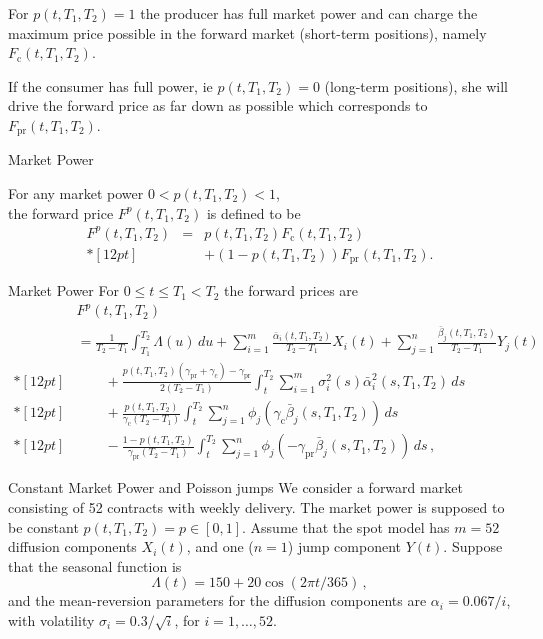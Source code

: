 	For $p(t,T_1,T_2)=1$ the
producer has full market power and can charge the maximum price possible in the forward market (short-term positions),
namely $F_{\text{c}}(t,T_1,T_2)$.


	If the
consumer has full power, ie $p(t,T_1,T_2)=0$ (long-term positions), she will drive the
forward price as far down as possible which corresponds to
$F_{\text{pr}}(t,T_1,T_2)$.






{Market Power}

For any market power $0<p(t,T_1,T_2)<1$,\\
the forward price $F^p(t,T_1,T_2)$ is defined to be
\begin{eqnarray}
\nonumber
F^p(t,T_1,T_2)&=&p(t,T_1,T_2)F_{\text{c}}(t,T_1,T_2)\\*[12pt]
&&+(1-p(t,T_1,T_2))
F_{\text{pr}}(t,T_1,T_2).
\end{eqnarray}

{Market Power}
For $0\leq t\leq T_1<T_2$ the forward prices are
$$\begin{array}{ll}
& F^p(t,T_1,T_2)\\
&=\frac1{T_2-T_1}\int_{T_1}^{T_2}\Lambda(u)\,du
+\sum_{i=1}^m\frac{\bar{\alpha}_i(t,T_1,T_2)}{T_2-T_1}X_i(t)+
\sum_{j=1}^n\frac{\bar{\beta}_j(t,T_1,T_2)}{T_2-T_1}Y_j(t) \\*[12pt]
&\qquad+\frac{p(t,T_1,T_2)(\gamma_{\text{pr}}+
\gamma_{\text{c}})-\gamma_{\text{pr}}}{2(T_2-T_1)}\int_t^{T_2}
\sum_{i=1}^m\sigma_i^2(s)\bar{\alpha}_i^2(s,T_1,T_2)\,ds \\*[12pt]
&\qquad+\frac{p(t,T_1,T_2)}{\gamma_{\text{c}}(T_2-T_1)}\int_t^{T_2}
\sum_{j=1}^n\phi_j(\gamma_{\text{c}}\bar{\beta}_j(s,T_1,T_2))\,ds \\*[12pt]
&\qquad-\frac{1-p(t,T_1,T_2)}{\gamma_{\text{pr}}(T_2-T_1)}
\int_t^{T_2}\sum_{j=1}^n\phi_j(-\gamma_{\text{pr}}\bar{\beta}_j(s,T_1,T_2))
\,ds\,,
\end{array}
$$

{Constant Market Power and Poisson jumps}
We consider a forward market consisting of 52 contracts with weekly delivery.
The market power is supposed to be constant $p(t,T_1,T_2)=p\in[0,1]$.
Assume that the spot model has $m=52$ diffusion components $X_i(t)$, and
one ($n=1$) jump component $Y(t)$. Suppose that the seasonal
function is
$$
\Lambda(t)=150+20\cos(2\pi t/365)\,,
$$
and the mean-reversion parameters for the diffusion components are
$\alpha_i=0.067/i$, with volatility $\sigma_i=0.3/\sqrt{i}$, for
$i=1,\ldots,52$.

